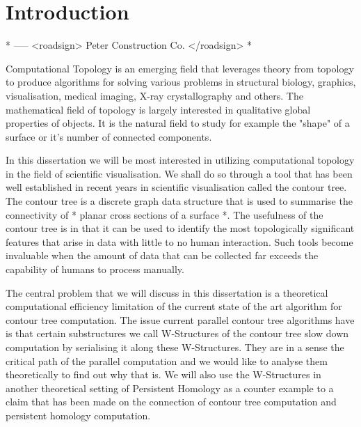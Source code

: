 \chapter{Introduction}
\label{chapter1}

* ----- <roadsign> Peter Construction Co. </roadsign> *


Computational Topology is an emerging field that leverages theory from topology to produce algorithms for solving various problems in structural biology, graphics, visualisation, medical imaging, X-ray crystallography and others. The mathematical field of topology is largely interested in qualitative global properties of objects. It is the natural field to study for example the "shape" of a surface or it's number of connected components. 

In this dissertation we will be most interested in utilizing computational topology in the field of scientific visualisation. We shall do so through a tool that has been well established in recent years in scientific visualisation called the contour tree. The contour tree is a discrete graph data structure that is used to summarise the connectivity of * planar cross sections of a surface *. The usefulness of the contour tree is in that it can be used to identify the most topologically significant features that arise in data with little to no human interaction. Such tools become invaluable when the amount of data that can be collected far exceeds the capability of humans to process manually. 

The central problem that we will discuss in this dissertation is a theoretical computational efficiency limitation of the current state of the art algorithm for contour tree computation. The issue current parallel contour tree algorithms have is that certain substructures we call W-Structures of the contour tree slow down computation by serialising it along these W-Structures. They are in a sense the critical path of the parallel computation and we would like to analyse them theoretically to find out why that is. We will also use the W-Structures in another theoretical setting of Persistent Homology as a counter example to a claim that has been made on the connection of contour tree computation and persistent homology computation.


